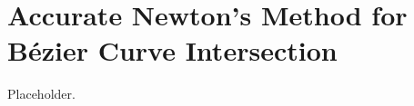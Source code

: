 \chapter{Accurate Newton's Method for B\'{e}zier Curve Intersection}\label{chap:compensated-newton}

Placeholder.
